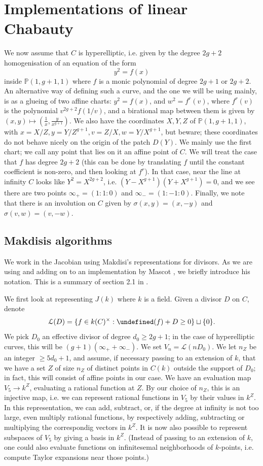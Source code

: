\documentclass[12pt]{article}
\newcommand{\Lcal}{\mathcal{L}}
\renewcommand{\P}{\mathbb{P}}
\let\div\undefined
\DeclareMathOperator{\div}{div}
\theoremstyle{plain}
\theoremstyle{definition}
\theoremstyle{remark}
\begin{document}
\section{Implementations of linear Chabauty}
\label{section:explicit}
We now assume that $C$ is hyperelliptic, i.e. given by the degree $2g+2$ homogenisation of an equation of the form
\[
y^2 = f(x)
\]
inside $\P(1,g+1,1)$ where $f$ is a monic polynomial of degree $2g+1$ or $2g+2$. An alternative way of defining such a curve, and the one we will be using mainly, is as a glueing of two affine charts: $y^2 = f(x)$, and $w^2 = f^{r}(v)$, where $f^{r}(v)$ is the polynomial $v^{2g + 2} f(1/v)$, and a birational map between them is given by $(x,y) \mapsto (\frac{1}{x},\frac{y}{x^{g+1}})$. We also have the coordinates $X,Y,Z$ of $\P(1,g+1,1)$, with $x = X/Z, y = Y/Z^{g+1}, v = Z/X, w = Y/X^{g+1}$, but beware; these coordinates do not behave nicely on the origin of the patch $D(Y)$. We mainly use the first chart; we call any point that lies on it an affine point of $C$. We will treat the case that $f$ has degree $2g+2$ (this can be done by translating $f$ until the constant coefficient is non-zero, and then looking at $f^r$). In that case, near the line at infinity $C$ looks like $Y^2 = X^{2g+2}$, i.e. $(Y-X^{g+1})(Y+X^{g+1}) = 0$, and we see there are two points $\infty_+ = (1:1:0)$ and $\infty_- = (1:-1:0)$. Finally, we note that there is an involution on $C$ given by $\sigma(x,y) = (x,-y)$ and $\sigma(v,w) = (v,-w)$.

\subsection{Makdisis algorithms}
We work in the Jacobian using Makdisi's representations for divisors. As we are using and adding on to an implementation by Mascot \cite{mascot2018}, we briefly introduce his notation. This is a summary of section 2.1 in \cite{mascot2018}.

We first look at representing $J(k)$ where $k$ is a field. Given a divisor $D$ on $C$, denote
\[
\Lcal(D) = \{f \in k(C)^\times : \div(f) + D \geq 0 \} \sqcup \{0\}.
\]
We pick $D_0$ an effective divisor of degree $d_0 \geq 2g+1$; in the case of hyperelliptic curves, this will be $(g+1)(\infty_+ + \infty_-)$. We set $V_n = \Lcal(nD_0)$. We let $n_Z$ be an integer $\geq 5d_0 + 1$, and assume, if necessary passing to an extension of $k$, that we have a set $Z$ of size $n_Z$ of distinct points in $C(k)$ outside the support of $D_0$; in fact, this will consist of affine points in our case. We have an evaluation map $V_5 \to k^Z$, evaluating a rational function at $Z$. By our choice of $n_Z$, this is an injective map, i.e. we can represent rational functions in $V_5$ by their values in $k^Z$. In this representation, we can add, subtract, or, if the degree at infinity is not too large, even multiply rational functions, by respectively adding, subtracting or multiplying the correspondig vectors in $k^Z$. It is now also possible to represent subspaces of $V_5$ by giving a basis in $k^Z$. (Instead of passing to an extension of $k$, one could also evaluate functions on infinitesemal neighborhoods of $k$-points, i.e. compute Taylor expansions near those points.)
\end{document}

